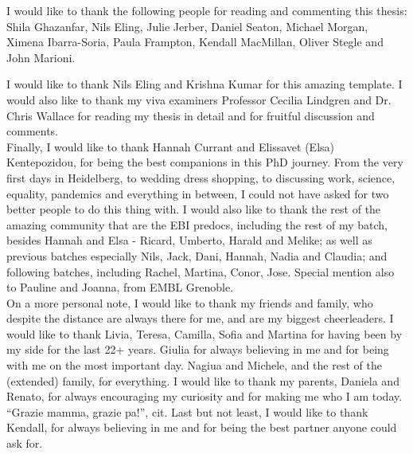 \begin{acknowledgements}
I would like to thank the following people for reading and commenting this thesis: 
Shila Ghazanfar, 
Nils Eling,
Julie Jerber,
Daniel Seaton,
Michael Morgan,
Ximena Ibarra-Soria,
Paula Frampton,
Kendall MacMillan,
Oliver Stegle and
John Marioni.

I would like to thank Nils Eling and Krishna Kumar for this amazing template. 
I would also like to thank my viva examiners Professor Cecilia Lindgren and Dr. Chris Wallace for reading my thesis in detail and for fruitful discussion and comments. \\

Finally, I would like to thank Hannah Currant and Elissavet (Elsa) Kentepozidou, for being the best companions in this PhD journey.
From the very first days in Heidelberg, to wedding dress shopping, to discussing work, science, equality, pandemics and everything in between, I could not have asked for two better people to do this thing with.
I would also like to thank the rest of the amazing community that are the EBI predocs, including the rest of my batch, besides Hannah and Elsa - Ricard, Umberto, Harald and Melike; as well as previous batches especially Nils, Jack, Dani, Hannah, Nadia and Claudia; and following batches, including Rachel, Martina, Conor, Jose. 
Special mention also to Pauline and Joanna, from EMBL Grenoble. \\


On a more personal note, I would like to thank my friends and family, who despite the distance are always there for me, and are my biggest cheerleaders.
I would like to thank Livia, Teresa, Camilla, Sofia and Martina for having been by my side for the last 22+ years.
Giulia for always believing in me and for being with me on the most important day.
Nagiua and Michele, and the rest of the (extended) family, for everything.
I would like to thank my parents, Daniela and Renato, for always encouraging my curiosity and for making me who I am today.
“Grazie mamma, grazie pa!”, cit.
Last but not least, I would like to thank Kendall, for always believing in me and for being the best partner anyone could ask for.

\end{acknowledgements}

